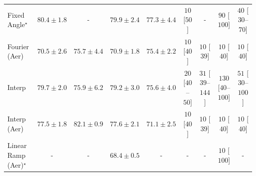 \begin{tabular}{l|cccc|cccc|}
Fixed Angle$^\star$ & {\cellcolor[HTML]{EA6E13}} \color[HTML]{F1F1F1} $80.4\pm 1.8$ & {\cellcolor[HTML]{000000}} \color[HTML]{F1F1F1} {\cellcolor{white}} \color{black} - & {\cellcolor[HTML]{EE7617}} \color[HTML]{F1F1F1} $79.9\pm 2.4$ & {\cellcolor[HTML]{FE9F2E}} \color[HTML]{000000} $77.3\pm 4.4$ & {\cellcolor[HTML]{FFF7F3}} \color[HTML]{000000} $10$ [$50$] & {\cellcolor[HTML]{000000}} \color[HTML]{F1F1F1} {\cellcolor{white}} \color{black} - & {\cellcolor[HTML]{FDE5E2}} \color[HTML]{000000} $90$ [$100$] & {\cellcolor[HTML]{FEF1ED}} \color[HTML]{000000} $40$ [$30$--$70$] \\
Fourier (Aer) & {\cellcolor[HTML]{FFF1B0}} \color[HTML]{000000} $70.5\pm 2.6$ & {\cellcolor[HTML]{FEB945}} \color[HTML]{000000} $75.7\pm 4.4$ & {\cellcolor[HTML]{FFEEA9}} \color[HTML]{000000} $70.9\pm 1.8$ & {\cellcolor[HTML]{FEBE4A}} \color[HTML]{000000} $75.4\pm 2.2$ & {\cellcolor[HTML]{FFF7F3}} \color[HTML]{000000} $10$ [$40$] & {\cellcolor[HTML]{FFF7F3}} \color[HTML]{000000} $10$ [$39$] & {\cellcolor[HTML]{FFF7F3}} \color[HTML]{000000} $10$ [$40$] & {\cellcolor[HTML]{FFF7F3}} \color[HTML]{000000} $10$ [$40$] \\
Interp & {\cellcolor[HTML]{F07919}} \color[HTML]{F1F1F1} $79.7\pm 2.0$ & {\cellcolor[HTML]{FEB643}} \color[HTML]{000000} $75.9\pm 6.2$ & {\cellcolor[HTML]{F4811D}} \color[HTML]{F1F1F1} $79.2\pm 3.0$ & {\cellcolor[HTML]{FEBA46}} \color[HTML]{000000} $75.6\pm 4.0$ & {\cellcolor[HTML]{FFF5F1}} \color[HTML]{000000} $20$ [$40$--$50$] & {\cellcolor[HTML]{FFF3EF}} \color[HTML]{000000} $31$ [$39$--$144$] & {\cellcolor[HTML]{FDDBD7}} \color[HTML]{000000} $130$ [$40$--$100$] & {\cellcolor[HTML]{FEEEEA}} \color[HTML]{000000} $51$ [$30$--$100$] \\
Interp (Aer) & {\cellcolor[HTML]{FE9B2B}} \color[HTML]{000000} $77.5\pm 1.8$ & {\cellcolor[HTML]{D65808}} \color[HTML]{F1F1F1} $82.1\pm 0.9$ & {\cellcolor[HTML]{FE9A2A}} \color[HTML]{000000} $77.6\pm 2.1$ & {\cellcolor[HTML]{FEEDA6}} \color[HTML]{000000} $71.1\pm 2.5$ & {\cellcolor[HTML]{FFF7F3}} \color[HTML]{000000} $10$ [$40$] & {\cellcolor[HTML]{FFF7F3}} \color[HTML]{000000} $10$ [$39$] & {\cellcolor[HTML]{FFF7F3}} \color[HTML]{000000} $10$ [$40$] & {\cellcolor[HTML]{FFF7F3}} \color[HTML]{000000} $10$ [$40$] \\
Linear Ramp (Aer)$^\star$ & {\cellcolor[HTML]{000000}} \color[HTML]{F1F1F1} {\cellcolor{white}} \color{black} - & {\cellcolor[HTML]{000000}} \color[HTML]{F1F1F1} {\cellcolor{white}} \color{black} - & {\cellcolor[HTML]{FFFBD2}} \color[HTML]{000000} $68.4\pm 0.5$ & {\cellcolor[HTML]{000000}} \color[HTML]{F1F1F1} {\cellcolor{white}} \color{black} - & {\cellcolor[HTML]{000000}} \color[HTML]{F1F1F1} {\cellcolor{white}} \color{black} - & {\cellcolor[HTML]{000000}} \color[HTML]{F1F1F1} {\cellcolor{white}} \color{black} - & {\cellcolor[HTML]{FFF7F3}} \color[HTML]{000000} $10$ [$100$] & {\cellcolor[HTML]{000000}} \color[HTML]{F1F1F1} {\cellcolor{white}} \color{black} - \\

\end{tabular}
